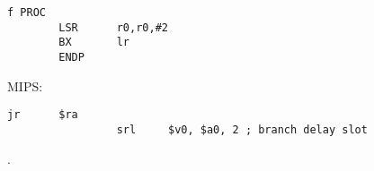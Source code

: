 \begin{lstlisting}[caption=\NonOptimizingKeilVI (\ARMMode)]
f PROC
        LSR      r0,r0,#2
        BX       lr
        ENDP
\end{lstlisting}
\fi

\ifdefined\IncludeMIPS
{} MIPS:

\begin{lstlisting}[caption=\Optimizing GCC 4.4.5 (IDA)]
                 jr      $ra
                 srl     $v0, $a0, 2 ; branch delay slot
\end{lstlisting}

 .
\fi
